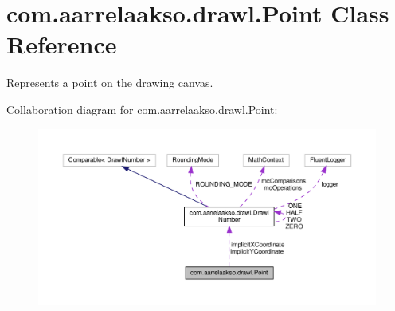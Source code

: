 \hypertarget{classcom_1_1aarrelaakso_1_1drawl_1_1_point}{}\section{com.\+aarrelaakso.\+drawl.\+Point Class Reference}
\label{classcom_1_1aarrelaakso_1_1drawl_1_1_point}


Represents a point on the drawing canvas.  




Collaboration diagram for com.\+aarrelaakso.\+drawl.\+Point\+:
\nopagebreak
\begin{figure}[H]
\begin{center}
\leavevmode
\includegraphics[width=350pt]{d8/d8b/classcom_1_1aarrelaakso_1_1drawl_1_1_point__coll__graph}
\end{center}
\end{figure}
